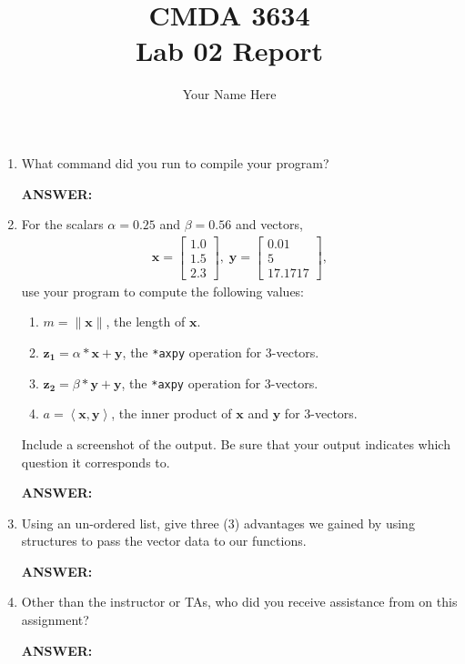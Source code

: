 \documentclass[letter]{article}
\title{CMDA 3634 \\ Lab 02 Report}
\author{Your Name Here}
\renewcommand{\vec}[1]{\ensuremath{\boldsymbol{#1}}} %
\begin{document}
\maketitle

\begin{enumerate}
    \item What command did you run to compile your program?
    
    \textbf{ANSWER:} %

    \item For the scalars $\alpha=0.25$ and $\beta = 0.56$ and vectors,
        \begin{align*}
            \vec{x} = \left[\begin{array}{r} 1.0 \\ 1.5 \\ 2.3 \end{array}\right], \;
            \vec{y} = \left[\begin{array}{r} 0.01 \\ 5 \\ 17.1717 \end{array}\right],
        \end{align*}
        use your program to compute the following values:
        \begin{enumerate}
            \item $m = \lVert\vec{x}\rVert$, the length of $\vec{x}$.
            \item $\vec{z_1} = \alpha * \vec{x} + \vec{y}$, the \texttt{*axpy} operation for 3-vectors.
            \item $\vec{z_2} = \beta * \vec{y} + \vec{y}$, the \texttt{*axpy} operation for 3-vectors.
            \item $a = \left<\vec{x}, \vec{y}\right>$, the inner product of $\vec{x}$ and $\vec{y}$ for 3-vectors.
        \end{enumerate}
        Include a screenshot of the output.  Be sure that your output indicates which question it corresponds to.
    
    \textbf{ANSWER:} %

    \item Using an un-ordered list, give three (3) advantages we gained by using structures to pass the vector data to our functions.
    
    \textbf{ANSWER:} %

    \item Other than the instructor or TAs, who did you receive assistance from on this assignment?
    
    \textbf{ANSWER:} %
\end{enumerate}
\end{document}
